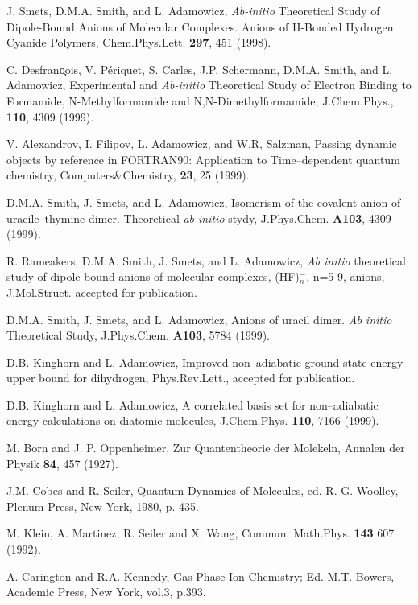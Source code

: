 {{\begin{thebibliography}{999}
{
J. Smets, D.M.A. Smith, and L. Adamowicz,
{\it Ab-initio} Theoretical Study of Dipole-Bound
Anions of Molecular Complexes. 
Anions of H-Bonded Hydrogen Cyanide Polymers,
Chem.Phys.Lett. {\bf 297}, 451 (1998).



C. Desfran\c{o}ois, V. P\'{e}riquet, S. Carles, J.P. Schermann,
D.M.A. Smith, and L. Adamowicz,
Experimental and {\it Ab-initio} Theoretical Study of Electron
Binding to Formamide, N-Methylformamide and N,N-Dimethylformamide,
J.Chem.Phys., {\bf 110}, 4309 (1999).

V. Alexandrov, I. Filipov, L. Adamowicz, and W.R, Salzman,
Passing dynamic objects by reference in FORTRAN90:
Application to Time--dependent quantum chemistry,
Computers\&Chemistry, {\bf 23}, 25 (1999).

D.M.A. Smith, J. Smets, and L. Adamowicz,
Isomerism of the covalent anion of uracile--thymine dimer.
Theoretical {\it ab initio} stydy,
J.Phys.Chem. {\bf A103}, 4309 (1999).

R. Rameakers, D.M.A. Smith, J. Smets, and L. Adamowicz,
{\it Ab initio} theoretical study of dipole-bound
anions of molecular complexes, (HF)$^-_n$, n=5-9,
anions, J.Mol.Struct. accepted for publication.

D.M.A. Smith, J. Smets, and L. Adamowicz,
Anions of uracil dimer. {\it Ab initio} Theoretical Study,
J.Phys.Chem. {\bf A103}, 5784 (1999).


D.B. Kinghorn and L. Adamowicz,
Improved non--adiabatic ground state energy
upper bound for dihydrogen,
Phys.Rev.Lett., accepted for publication.


D.B. Kinghorn and L. Adamowicz,
A correlated basis set for non--adiabatic energy 
calculations on diatomic molecules,
J.Chem.Phys. {\bf 110}, 7166 (1999).


 M. Born and J. P. Oppenheimer, 
Zur Quantentheorie der Molekeln,
Annalen der Physik 
{\bf 84}, 457 (1927).

 J.M. Cobes and R. Seiler, Quantum Dynamics of Molecules,
ed. R. G.  Woolley, Plenum Press, New York, 1980, p. 435.

 M. Klein, A. Martinez, R. Seiler and X. Wang, Commun.
Math.Phys. {\bf 143}  607 (1992).

A. Carington and R.A. Kennedy, Gas Phase Ion Chemistry;
Ed. M.T. Bowers, Academic Press, New York, vol.3, p.393.





}
\end{thebibliography}}}
